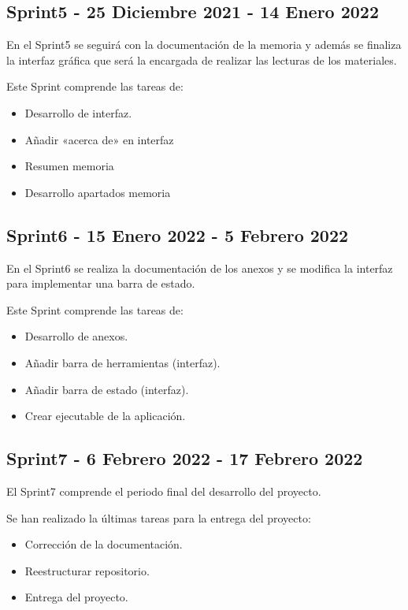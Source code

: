 \subsection{Sprint5 - 25 Diciembre 2021 - 14 Enero 2022}

En el Sprint5 se seguirá con la documentación de la memoria y además se finaliza la interfaz gráfica que será la encargada de realizar las lecturas de los materiales.

Este Sprint comprende las tareas de:

\begin{itemize}
\item Desarrollo de interfaz.
\item Añadir «acerca de» en interfaz
\item Resumen memoria
\item Desarrollo apartados memoria
\end{itemize}
\subsection{Sprint6 - 15 Enero 2022 - 5 Febrero 2022}

En el Sprint6 se realiza la documentación de los anexos y se modifica la interfaz para implementar una barra de estado.

Este Sprint comprende las tareas de:

\begin{itemize}
\item Desarrollo de anexos.
\item Añadir barra de herramientas (interfaz).
\item Añadir barra de estado (interfaz).
\item Crear ejecutable de la aplicación.
\end{itemize}

\subsection{Sprint7 - 6 Febrero 2022 - 17 Febrero 2022}

El Sprint7 comprende el periodo final del desarrollo del proyecto.

Se han realizado la últimas tareas para la entrega del proyecto:

\begin{itemize}
\item Corrección de la documentación.
\item Reestructurar repositorio.
\item Entrega del proyecto.
\end{itemize}

